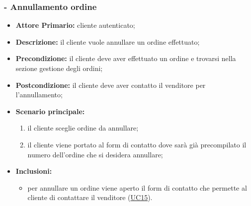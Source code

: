 \subsubsection{ - Annullamento ordine}
\begin{itemize}
    \item \textbf{Attore Primario:} cliente autenticato;
    \item \textbf{Descrizione:} il cliente vuole annullare un ordine effettuato;
    \item \textbf{Precondizione:} il cliente deve aver effettuato un ordine e trovarsi nella sezione gestione degli ordini;
    \item \textbf{Postcondizione:} il cliente deve aver contatto il venditore per l'annullamento;
    \item \textbf{Scenario principale:}
          \begin{enumerate}
              \item il cliente sceglie ordine da annullare;
              \item il cliente viene portato al form di contatto dove sarà già precompilato il numero dell'ordine che si desidera annullare;
          \end{enumerate}
    \item \textbf{Inclusioni:}
          \begin{itemize}
              \item per annullare un ordine viene aperto il form di contatto che permette al cliente di contattare il venditore (\hyperref[UC15]{UC15}).
          \end{itemize}
\end{itemize}

\stepsubUserCase

